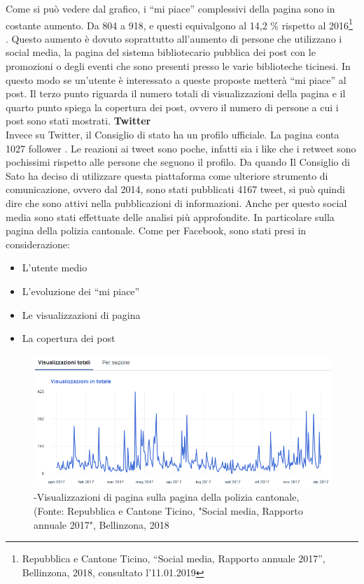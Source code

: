 Come si può vedere dal grafico, i “mi piace” complessivi della pagina sono in costante aumento. Da 804 a 918, e questi equivalgono al 14,2 \% rispetto al 2016\footnote{Repubblica e Cantone Ticino, “Social media, Rapporto annuale 2017”, Bellinzona, 2018, consultato l’11.01.2019} . Questo aumento è dovuto soprattutto all’aumento di persone che utilizzano i social media, la pagina del sistema bibliotecario pubblica dei post con le promozioni o degli eventi che sono presenti presso le varie biblioteche ticinesi. In questo modo se un’utente è interessato a queste proposte metterà “mi piace” al post. Il terzo punto riguarda il numero totali di visualizzazioni della pagina e il quarto punto spiega la copertura dei post, ovvero il numero di persone a cui i post sono stati mostrati.
\newpage
\textbf {Twitter}\\
Invece su Twitter, il Consiglio di stato ha un profilo ufficiale. La pagina conta 1027 follower . Le reazioni ai tweet sono poche, infatti sia i like che i retweet sono pochissimi rispetto alle persone che seguono il profilo. Da quando Il Consiglio di Sato ha deciso di utilizzare questa piattaforma come ulteriore strumento di comunicazione, ovvero dal 2014, sono stati pubblicati 4167 tweet, si può quindi dire che sono attivi nella pubblicazioni di informazioni. Anche per questo social media sono stati effettuate delle analisi più approfondite. In particolare sulla pagina della polizia cantonale. Come per Facebook, sono stati presi in considerazione:
\begin{itemize}
    \item L’utente medio
    \item L’evoluzione dei “mi piace”
    \item Le visualizzazioni di pagina
    \item La copertura dei post
\end{itemize}
\begin{figure}[h]
    \includegraphics[width=\textwidth]{capitoli/foto/visualizzazioni.png}
    \caption{-Visualizzazioni di pagina sulla pagina della polizia cantonale, (Fonte: Repubblica e Cantone Ticino, "Social media, Rapporto annuale 2017", Bellinzona, 2018}
    \label{fig:my_label}
\end{figure}

